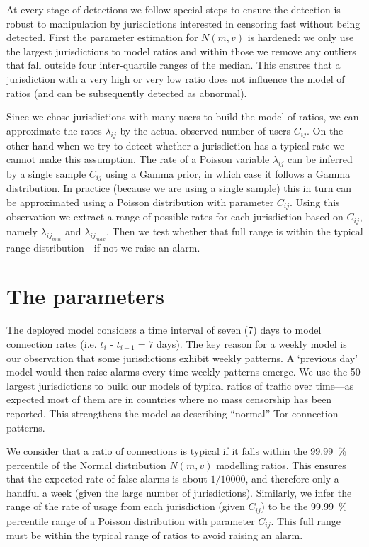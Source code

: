 \documentclass{article}
\begin{document}
At every stage of detections we follow special steps to ensure the
detection is robust to manipulation by jurisdictions interested in
censoring fast without being detected.
First the parameter estimation for $N(m,v)$ is hardened: we only use the
largest jurisdictions to model ratios and within those we remove any
outliers that fall outside four inter-quartile ranges of the median.
This ensures that a jurisdiction with a very high or very low ratio does
not influence the model of ratios (and can be subsequently detected as
abnormal).

Since we chose jurisdictions with many users to build the model of ratios,
we can approximate the rates $\lambda_{ij}$ by the actual observed number
of users $C_{ij}$.
On the other hand when we try to detect whether a jurisdiction has a
typical rate we cannot make this assumption.
The rate of a Poisson variable $\lambda_{ij}$ can be inferred by a single
sample $C_{ij}$ using a Gamma prior, in which case it follows a Gamma
distribution.
In practice (because we are using a single sample) this in turn can be
approximated using a Poisson distribution with parameter $C_{ij}$.
Using this observation we extract a range of possible rates for each
jurisdiction based on $C_{ij}$, namely $\lambda_{ij_{min}}$ and
$\lambda_{ij_{max}}$.
Then we test whether that full range is within the typical range
distribution---if not we raise an alarm.

\section{The parameters}

The deployed model considers a time interval of seven (7) days to model
connection rates (i.e. $t_i$ - $t_{i-1} = 7$ days).
The key reason for a weekly model is our observation that some
jurisdictions exhibit weekly patterns.
A `previous day' model would then raise alarms every time weekly patterns
emerge.
We use the 50 largest jurisdictions to build our models of typical ratios
of traffic over time---as expected most of them are in countries where no
mass censorship has been reported.
This strengthens the model as describing ``normal'' Tor connection
patterns.

We consider that a ratio of connections is typical if it falls within the
99.99~\% percentile of the Normal distribution $N(m,v)$ modelling ratios.
This ensures that the expected rate of false alarms is about $1 / 10000$,
and therefore only a handful a week (given the large number of
jurisdictions).
Similarly, we infer the range of the rate of usage from each jurisdiction
(given $C_{ij}$) to be the 99.99~\% percentile range of a Poisson
distribution with parameter $C_{ij}$.
This full range must be within the typical range of ratios to avoid
raising an alarm.
\end{document}
